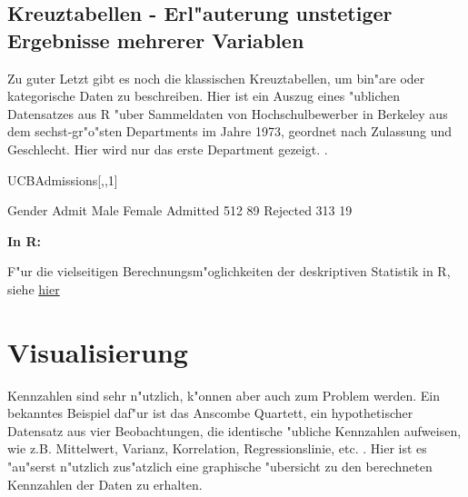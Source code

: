 \documentclass[a4paper,twoside]{tufte-book}\usepackage[]{graphicx}\usepackage[]{color}
\begin{document}
\subsection{Kreuztabellen - Erl"auterung unstetiger Ergebnisse mehrerer Variablen}

Zu guter Letzt gibt es noch die klassischen Kreuztabellen, um bin"are oder kategorische Daten zu beschreiben. Hier ist ein Auszug eines "ublichen Datensatzes aus R "uber Sammeldaten von Hochschulbewerber in Berkeley aus dem sechst-gr"o"sten Departments im Jahre 1973, geordnet nach Zulassung und Geschlecht. Hier wird nur das erste Department gezeigt.
.

\begin{Schunk}
\begin{Sinput}
UCBAdmissions[,,1]
\end{Sinput}
\begin{Soutput}
          Gender
Admit      Male Female
  Admitted  512     89
  Rejected  313     19
\end{Soutput}
\end{Schunk}


\vspace{1cm}
\begin{fullwidth}
\begin{mdframed}
    
\textbf{In R:} 

F"ur die vielseitigen Berechnungsm"oglichkeiten der deskriptiven Statistik in R, siehe \href{http://www.uni-kiel.de/psychologie/rexrepos/rerDescriptive.html}{hier}

\end{mdframed}
\end{fullwidth} 


\section{Visualisierung}


Kennzahlen sind sehr n"utzlich, k"onnen aber auch zum Problem werden. Ein bekanntes Beispiel daf"ur ist das Anscombe Quartett, ein hypothetischer Datensatz aus vier Beobachtungen, die identische "ubliche Kennzahlen aufweisen, wie z.B. Mittelwert, Varianz, Korrelation, Regressionslinie, etc. \citep{Anscombe-Graphsinstatistical-1973}. Hier ist es "au"serst n"utzlich zus"atzlich eine graphische "ubersicht zu den berechneten Kennzahlen der Daten zu erhalten.
\end{document}

